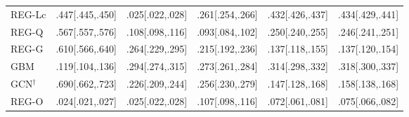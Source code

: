 \begin{tabular}{lccccc}
REG-Lc & .447[.445,.450] & .025[.022,.028] & .261[.254,.266] & .432[.426,.437] & .434[.429,.441] \\
REG-Q & .567[.557,.576] & .108[.098,.116] & .093[.084,.102] & .250[.240,.255] & .246[.241,.251] \\
REG-G & .610[.566,.640] & .264[.229,.295] & .215[.192,.236] & .137[.118,.155] & .137[.120,.154] \\
GBM & .119[.104,.136] & .294[.274,.315] & .273[.261,.284] & .314[.298,.332] & .318[.300,.337] \\
GCN$^{\dagger}$ & .690[.662,.723] & .226[.209,.244] & .256[.230,.279] & .147[.128,.168] & .158[.138,.168] \\
REG-O & .024[.021,.027] & .025[.022,.028] & .107[.098,.116] & .072[.061,.081] & .075[.066,.082] \\
\bottomrule
\end{tabular}
